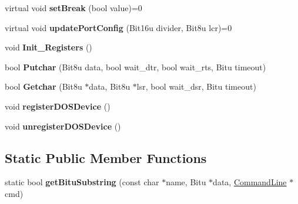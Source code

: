 \begin{DoxyCompactItemize}
\item 
\hypertarget{classCSerial_addc5a34780ee353f12938e5a9e415e26}{virtual void {\bfseries set\-Break} (bool value)=0}\label{classCSerial_addc5a34780ee353f12938e5a9e415e26}

\item 
\hypertarget{classCSerial_a55aa5e9e9dc361068c5388fee1bb14e3}{virtual void {\bfseries update\-Port\-Config} (Bit16u divider, Bit8u lcr)=0}\label{classCSerial_a55aa5e9e9dc361068c5388fee1bb14e3}

\item 
\hypertarget{classCSerial_af5cb5a4a7736486967d4c4ffa65aa4b9}{void {\bfseries Init\-\_\-\-Registers} ()}\label{classCSerial_af5cb5a4a7736486967d4c4ffa65aa4b9}

\item 
\hypertarget{classCSerial_a08815d6c2f3e806df2a9c33130451402}{bool {\bfseries Putchar} (Bit8u data, bool wait\-\_\-dtr, bool wait\-\_\-rts, Bitu timeout)}\label{classCSerial_a08815d6c2f3e806df2a9c33130451402}

\item 
\hypertarget{classCSerial_a6b5cb502f087dd0dfcc167850fd862e9}{bool {\bfseries Getchar} (Bit8u $\ast$data, Bit8u $\ast$lsr, bool wait\-\_\-dsr, Bitu timeout)}\label{classCSerial_a6b5cb502f087dd0dfcc167850fd862e9}

\item 
\hypertarget{classCSerial_afe1ce6961b0ea41e443aa12b3cb2cf3e}{void {\bfseries register\-D\-O\-S\-Device} ()}\label{classCSerial_afe1ce6961b0ea41e443aa12b3cb2cf3e}

\item 
\hypertarget{classCSerial_ae27ec35dbb2623318271adb009077a76}{void {\bfseries unregister\-D\-O\-S\-Device} ()}\label{classCSerial_ae27ec35dbb2623318271adb009077a76}

\end{DoxyCompactItemize}
\subsection*{Static Public Member Functions}
\begin{DoxyCompactItemize}
\item 
\hypertarget{classCSerial_a82488f4091ff6dfa6b40c708642f3df4}{static bool {\bfseries get\-Bitu\-Substring} (const char $\ast$name, Bitu $\ast$data, \hyperlink{classCommandLine}{Command\-Line} $\ast$cmd)}\label{classCSerial_a82488f4091ff6dfa6b40c708642f3df4}

\end{DoxyCompactItemize}
